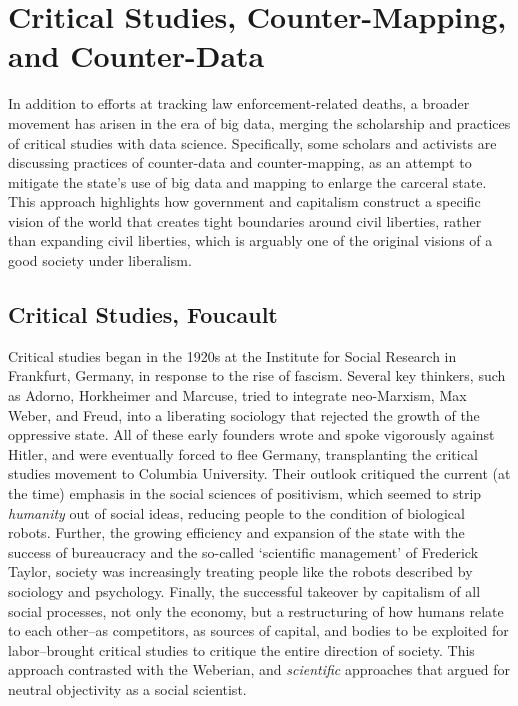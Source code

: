 \documentclass[sigconf]{acmart}
\begin{document}
\section{Critical Studies, Counter-Mapping, and Counter-Data}
In addition to efforts at tracking law enforcement-related deaths, a broader movement has arisen in the era of big data, merging the scholarship and practices of critical studies with data science.  Specifically, some scholars and activists are discussing practices of counter-data and counter-mapping, as an attempt to mitigate the state's use of big data and mapping to enlarge the carceral state. \cite{jefferson17,currie16,dalton17,ccc12}  This approach highlights how government and capitalism construct a specific vision of the world that creates tight boundaries around civil liberties, rather than expanding civil liberties, which is arguably one of the original visions of a good society under liberalism.

\subsection{Critical Studies, Foucault}
Critical studies began in the 1920s at the Institute for Social Research in Frankfurt, Germany, in response to the rise of fascism. \cite{ritzer18,seidman16}  Several key thinkers, such as Adorno, Horkheimer and Marcuse, tried to integrate neo-Marxism, Max Weber, and Freud, into a liberating sociology that rejected the growth of the oppressive state.  All of these early founders wrote and spoke vigorously against Hitler, and were eventually forced to flee Germany, transplanting the critical studies movement to Columbia University. \cite{ritzer18}  Their outlook critiqued the current (at the time) emphasis in the social sciences of positivism, which seemed to strip {\em humanity} out of social ideas, reducing people to the condition of biological robots.  Further, the growing efficiency and expansion of the state with the success of bureaucracy and the so-called `scientific management' of Frederick Taylor, society was increasingly treating people like the robots described by sociology and psychology.  Finally, the successful takeover by capitalism of all social processes, not only the economy, but a restructuring of how humans relate to each other--as competitors, as sources of capital, and bodies to be exploited for labor--brought critical studies to critique the entire direction of society.  This approach contrasted with the Weberian, and {\em scientific} approaches that argued for neutral objectivity as a social scientist. \cite{ritzer18,seidman16}
\end{document}
